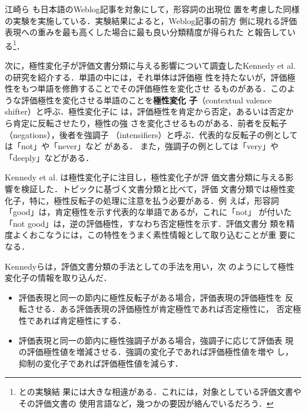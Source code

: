 江崎ら \cite{esaki2005a}も日本語のWeblog記事を対象にして，形容詞の出現位
置を考慮した同様の実験を実施している．実験結果によると，Weblog記事の前方
側に現れる評価表現への重みを最も高くした場合に最も良い分類精度が得られた
と報告している\footnote{ \cite{taboada2004a}と\cite{esaki2005a}の実験結
果には大きな相違がある．これには，対象としている評価文書やその評価文書の
使用言語など，幾つかの要因が絡んでいるだろう．}．

\vspace{1em}
次に，極性変化子が評価文書分類に与える影響について調査したKennedy et
al. \cite{kennedy2005a}の研究を紹介する．単語の中には，それ単体は評価極
性を持たないが，評価極性をもつ単語を修飾することでその評価極性を変化させ
るものがある．このような評価極性を変化させる単語のことを\textbf{極性変化
子}（contextual valence shifter）と呼ぶ\cite{polanyi2004a}．極性変化子に
は，評価極性を肯定から否定，あるいは否定から肯定に反転させたり，極性の強
さを変化させるものがある．前者を反転子（negations），後者を強調子
（intensifiers）と呼ぶ．代表的な反転子の例としては「not」や「never」など
がある．
また，強調子の例としては「very」や「deeply」などがある．

\vspace{1em}
\underline{\textbf{\cite{kennedy2005a}}}
\vspace{1em}

Kennedy et al. \cite{kennedy2005a} は極性変化子に注目し，極性変化子が評
価文書分類に与える影響を検証した．トピックに基づく文書分類と比べて，評価
文書分類では極性変化子，特に，極性反転子の処理に注意を払う必要がある．例
えば，形容詞「good」は，肯定極性を示す代表的な単語であるが，これに「not」
が付いた「not good」は，逆の評価極性，すなわち否定極性を示す．評価文書分
類を精度よくおこなうには，この特性をうまく素性情報として取り込むことが重
要になる．

Kennedyらは，評価文書分類の手法として\cite{turney2002a}の手法を用い，次
のようにして極性変化子の情報を取り込んだ．
\begin{itemize}
 \item 評価表現と同一の節内に極性反転子がある場合，評価表現の評価極性を
       反転させる．ある評価表現の評価極性が肯定極性であれば否定極性に，
       否定極性であれば肯定極性にする．

 \item 評価表現と同一の節内に極性強調子がある場合，強調子に応じて評価表
       現の評価極性値を増減させる．強調の変化子であれば評価極性値を増や
       し，抑制の変化子であれば評価極性値を減らす．
\end{itemize}

